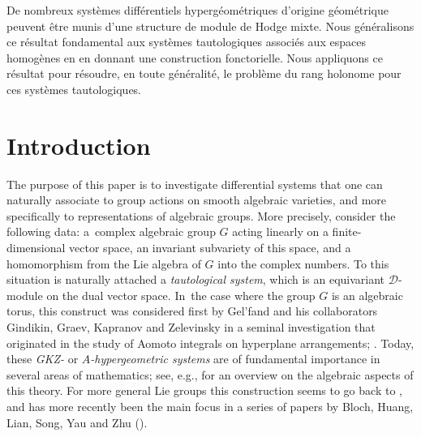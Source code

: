 \documentclass[JEP,XML,SOM,Unicode,published]{cedram}
\begin{document}



\begin{altabstract}
De nombreux systèmes différentiels hypergéométriques d’origine géométrique peuvent être munis d’une structure de module de Hodge mixte. Nous généralisons ce résultat fondamental aux systèmes tautologiques associés aux espaces homogènes en en donnant une construction fonctorielle. Nous appliquons ce résultat pour résoudre, en toute généralité, le problème du rang holonome pour ces systèmes tautologiques.
\end{altabstract}

\maketitle
\vspace*{-\baselineskip}
\tableofcontents
\mainmatter

\vspace*{-2\baselineskip}\vskip0pt
\section{Introduction} \label{sec:intro}

The purpose of this paper is to investigate differential systems that
one can naturally associate to group actions on smooth algebraic
varieties, and more specifically to representations of algebraic
groups. More precisely, consider
the following data: a~complex algebraic group $G$
acting linearly on a finite-dimensional vector space, an invariant
subvariety of this space, and a homomorphism from the Lie algebra of
$G$ into the complex numbers. To this situation is naturally
attached a \emph{tautological system}, which is an equivariant
$\mathscr{D}$\nobreakdash-mod\-ule on the dual vector space. In~the case where the group $G$
is an algebraic torus, this construct
was considered first by Gel'fand and his collaborators
Gindikin, Graev, Kapranov and Zelevinsky in a seminal investigation
that originated in the study of Aomoto integrals on hyperplane
arrangements; \cf \cite{GGG80,GG86,GZ86,GGZ87,GKZ89,GKZ90}. Today,
these \emph{GKZ-} or \emph{$A$-hypergeometric systems} are of
fundamental importance in several areas of mathematics; see, e.g.,
\cite{GKZReview} for an overview on the algebraic aspects of this
theory.
For more general Lie groups this construction seems to
go back to \cite[\S II.4]{Hot98}, and has more recently been the
main focus in a series of papers by Bloch, Huang, Lian, Song, Yau and
Zhu (\cite{TautPeriod1, Bloch_HolRankProb, TautPeriod2,
HuangLianZhu}).
\end{document}
